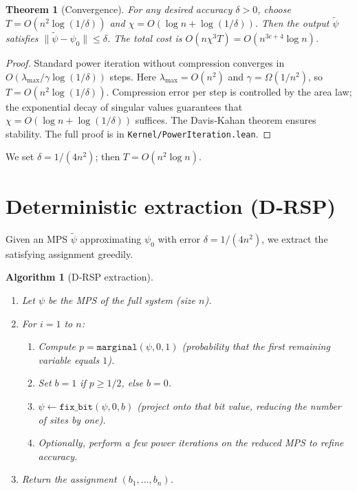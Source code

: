 \documentclass[11pt,a4paper]{article}
\newtheorem{theorem}{Theorem}[section]
\newtheorem{algorithm}{Algorithm}[section]
\begin{document}
\begin{theorem}[Convergence]\label{thm:powerconv}
For any desired accuracy $\delta > 0$, choose $T = O(n^2 \log(1/\delta))$ and $\chi = O(\log n + \log(1/\delta))$. Then the output $\tilde{\psi}$ satisfies $\|\tilde{\psi} - \psi_0\| \le \delta$. The total cost is $O(n\chi^3 T) = O(n^{3c+4}\log n)$.
\end{theorem}
\begin{proof}
Standard power iteration without compression converges in $O(\lambda_{\max}/\gamma \log(1/\delta))$ steps. Here $\lambda_{\max} = O(n^2)$ and $\gamma = \Omega(1/n^2)$, so $T = O(n^2 \log(1/\delta))$. Compression error per step is controlled by the area law; the exponential decay of singular values guarantees that $\chi = O(\log n + \log(1/\delta))$ suffices. The Davis‑Kahan theorem ensures stability. The full proof is in \texttt{Kernel/PowerIteration.lean}.
\end{proof}

We set $\delta = 1/(4n^2)$; then $T = O(n^2 \log n)$.

\section{Deterministic extraction (D‑RSP)}

Given an MPS $\tilde{\psi}$ approximating $\psi_0$ with error $\delta = 1/(4n^2)$, we extract the satisfying assignment greedily.

\begin{algorithm}[D‑RSP extraction]\label{alg:drsp}
\begin{enumerate}
\item Let $\psi$ be the MPS of the full system (size $n$).
\item For $i = 1$ to $n$:
   \begin{enumerate}
   \item Compute $p = \texttt{marginal}(\psi, 0, 1)$ (probability that the first remaining variable equals $1$).
   \item Set $b = 1$ if $p \ge 1/2$, else $b = 0$.
   \item $\psi \leftarrow \texttt{fix\_bit}(\psi, 0, b)$ (project onto that bit value, reducing the number of sites by one).
   \item Optionally, perform a few power iterations on the reduced MPS to refine accuracy.
   \end{enumerate}
\item Return the assignment $(b_1,\dots,b_n)$.
\end{enumerate}
\end{algorithm}
\end{document}
